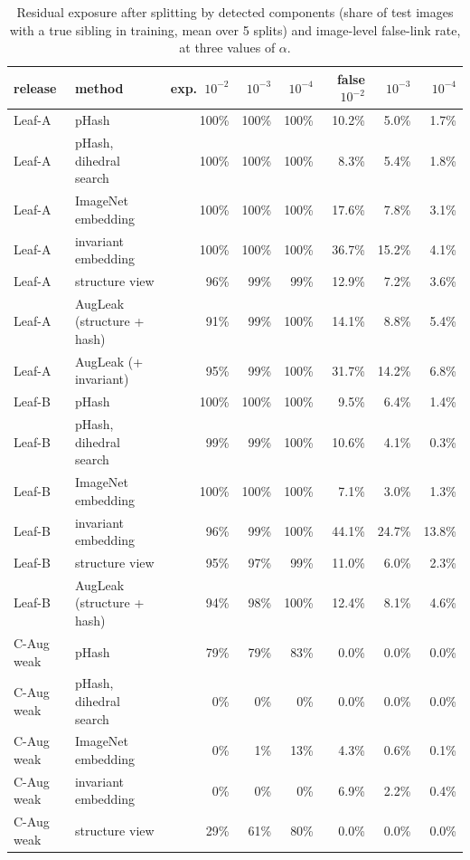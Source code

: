 \begin{table}[h]
\centering\footnotesize
\setlength{\tabcolsep}{4pt}
\caption{Residual exposure after splitting by detected components (share of test images with a true sibling in training, mean over 5 splits) and image-level false-link rate, at three values of $\alpha$.}
\label{tab:resid}
\begin{tabular}{@{}llrrrrrr@{}}
\toprule
release & method & exp.\ $10^{-2}$ & $10^{-3}$ & $10^{-4}$ & false $10^{-2}$ & $10^{-3}$ & $10^{-4}$ \\
\midrule
Leaf-A & pHash & 100\% & 100\% & 100\% & 10.2\% & 5.0\% & 1.7\% \\
Leaf-A & pHash, dihedral search & 100\% & 100\% & 100\% & 8.3\% & 5.4\% & 1.8\% \\
Leaf-A & ImageNet embedding & 100\% & 100\% & 100\% & 17.6\% & 7.8\% & 3.1\% \\
Leaf-A & invariant embedding & 100\% & 100\% & 100\% & 36.7\% & 15.2\% & 4.1\% \\
Leaf-A & structure view & 96\% & 99\% & 99\% & 12.9\% & 7.2\% & 3.6\% \\
Leaf-A & AugLeak (structure + hash) & 91\% & 99\% & 100\% & 14.1\% & 8.8\% & 5.4\% \\
Leaf-A & AugLeak (+ invariant) & 95\% & 99\% & 100\% & 31.7\% & 14.2\% & 6.8\% \\
Leaf-B & pHash & 100\% & 100\% & 100\% & 9.5\% & 6.4\% & 1.4\% \\
Leaf-B & pHash, dihedral search & 99\% & 99\% & 100\% & 10.6\% & 4.1\% & 0.3\% \\
Leaf-B & ImageNet embedding & 100\% & 100\% & 100\% & 7.1\% & 3.0\% & 1.3\% \\
Leaf-B & invariant embedding & 96\% & 99\% & 100\% & 44.1\% & 24.7\% & 13.8\% \\
Leaf-B & structure view & 95\% & 97\% & 99\% & 11.0\% & 6.0\% & 2.3\% \\
Leaf-B & AugLeak (structure + hash) & 94\% & 98\% & 100\% & 12.4\% & 8.1\% & 4.6\% \\
C-Aug weak & pHash & 79\% & 79\% & 83\% & 0.0\% & 0.0\% & 0.0\% \\
C-Aug weak & pHash, dihedral search & 0\% & 0\% & 0\% & 0.0\% & 0.0\% & 0.0\% \\
C-Aug weak & ImageNet embedding & 0\% & 1\% & 13\% & 4.3\% & 0.6\% & 0.1\% \\
C-Aug weak & invariant embedding & 0\% & 0\% & 0\% & 6.9\% & 2.2\% & 0.4\% \\
C-Aug weak & structure view & 29\% & 61\% & 80\% & 0.0\% & 0.0\% & 0.0\% \\

\end{tabular}
\end{table}
